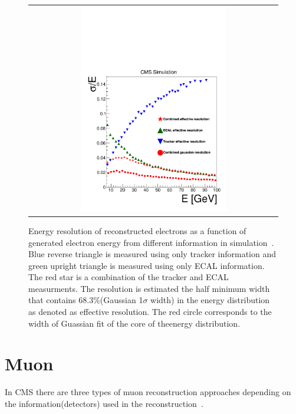 \begin{figure}[htp] 
\centering 
\begin{tabular}{c} 
\includegraphics[width=0.6\textwidth]{figures/effRMSfinal-3.pdf} 
\end{tabular} 
\caption{Energy resolution of reconstructed electrons as a function 
of generated electron energy from different information 
in simulation~\cite{PAS-HIG-13-002}. 
Blue reverse triangle is measured using only tracker information 
and green upright triangle is measured using only ECAL information. 
The red star is a combination of the tracker and ECAL measurments. 
The resolution is estimated the half minimum width that
contains 68.3\%(Gaussian 1$\sigma$ width) in the energy distribution
as denoted as effective resolution. The red circle corresponds to the 
width of Guassian fit of the core of theenergy distribution.
}
\label{fig:ElectronEnergyResMC} 
\end{figure} 

\section{ Muon }

In CMS there are three types of muon reconstruction approaches 
depending on the information(detectors) used in the reconstruction~\cite{cmstdr1}.  

